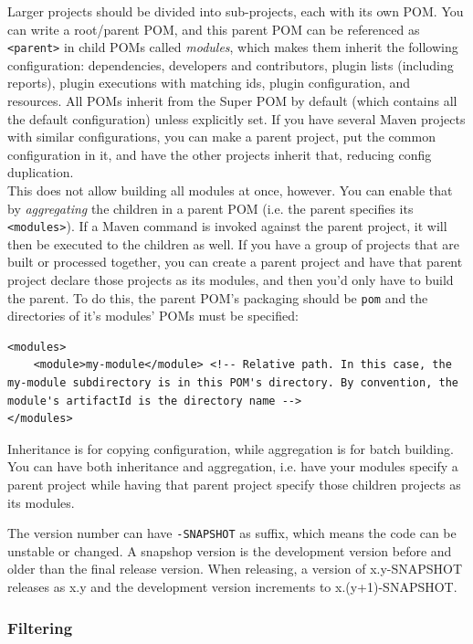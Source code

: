 \documentclass[table, xcdraw]{article}%
\begin{document}
Larger projects should be divided into sub-projects, each with its own POM. You can write a root/parent POM, and this parent POM can be referenced as \texttt{<parent>} in child POMs called \emph{modules}, which makes them inherit the following configuration: dependencies, developers and contributors, plugin lists (including reports), plugin executions with matching ids, plugin configuration, and resources. All POMs inherit from the Super POM by default (which contains all the default configuration) unless explicitly set. If you have several Maven projects with similar configurations, you can make a parent project, put the common configuration in it, and have the other projects inherit that, reducing config duplication.\\
This does not allow building all modules at once, however. You can enable that by \emph{aggregating} the children in a parent POM (i.e. the parent specifies its \texttt{<modules>}). If a Maven command is invoked against the parent project, it will then be executed to the children as well. If you have a group of projects that are built or processed together, you can create a parent project and have that parent project declare those projects as its modules, and then you'd only have to build the parent. To do this, the parent POM's packaging should be \texttt{pom} and the directories of it's modules' POMs must be specified:

\begin{verbatim}
<modules>
    <module>my-module</module> <!-- Relative path. In this case, the my-module subdirectory is in this POM's directory. By convention, the module's artifactId is the directory name -->
</modules>
\end{verbatim}

Inheritance is for copying configuration, while aggregation is for batch building. You can have both inheritance and aggregation, i.e. have your modules specify a parent project while having that parent project specify those children projects as its modules.

The version number can have \texttt{-SNAPSHOT} as suffix, which means the code can be unstable or changed. A snapshop version is the development version before and older than the final release version. When releasing, a version of x.y-SNAPSHOT releases as x.y and the development version increments to x.(y+1)-SNAPSHOT.

\subsubsection{Filtering}
\end{document}
